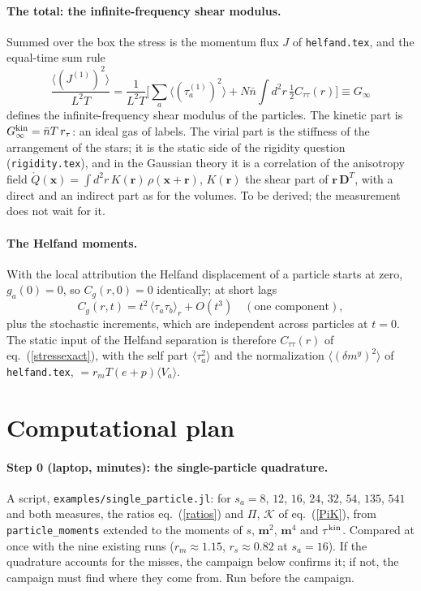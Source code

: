 \documentclass[11pt,aps,preprint,nofootinbib,superscriptaddress,tightenlines]{revtex4-2}
\newcommand{\avg}[1]{\langle #1\rangle}
\def\st{\begin{equation}}
\def\stp{\end{equation}}
\def\Eq#1{eq.~(\ref{#1})}
\let\oldparagraph\paragraph
\renewcommand{\paragraph}{\par\bigskip\oldparagraph}
\begin{document}
\paragraph{The total: the infinite-frequency shear modulus.}  Summed over the box the stress is the momentum flux $J$ of \texttt{helfand.tex}, and the
equal-time sum rule
\st
\frac{\avg{(J^{(1)})^2}}{L^2T}=\frac1{L^2T}\Big[\sum_a\avg{(\tau_a^{(1)})^2}+N\bar n\int d^2r\,\tfrac12C_{\tau\tau}(r)\Big]\equiv G_\infty
\stp
defines the infinite-frequency shear modulus of the particles.  The kinetic part is $G_\infty^{\rm kin}=\bar nT\,r_\tau$: an ideal gas of labels.  The
virial part is the stiffness of the arrangement of the stars; it is the static side of the rigidity question (\texttt{rigidity.tex}), and in the
Gaussian theory it is a correlation of the anisotropy field $\mathring Q(\bm x)=\int d^2r\,K(\bm r)\,\rho(\bm x+\bm r)$, $K(\bm r)$ the shear part of $\bm r\,\bm D^T$, with a direct
and an indirect part as for the volumes.  To be derived; the measurement does not wait for it.

\paragraph{The Helfand moments.}  With the local attribution the Helfand displacement of a particle starts at zero, $g_a(0)=0$, so $C_g(r,0)=0$
identically; at short lags
\st
C_g(r,t)=t^2\,\avg{\tau_a\tau_b}_r+O(t^3)\quad(\text{one component}),
\stp
plus the stochastic increments, which are independent across particles at $t=0$.  The static input of the Helfand separation is therefore
$C_{\tau\tau}(r)$ of \Eq{stressexact}, with the self part $\avg{\tau_a^2}$ and the normalization $\avg{(\delta m^y)^2}$ of \texttt{helfand.tex}, $=r_mT(e+p)\avg{V_a}$.

\section{Computational plan}
\label{sec:plan}

\paragraph{Step 0 (laptop, minutes): the single-particle quadrature.}  A script, \texttt{examples/}\allowbreak\texttt{single\_particle.jl}: for $s_a=8$, $12$, $16$, $24$, $32$, $54$, $135$, $541$
and both measures, the ratios \Eq{ratios} and $\Pi$, $\mathcal K$ of \Eq{PiK}, from \texttt{particle\_moments} extended to the moments of $s$, $\bm m^2$,
$\bm m^4$ and $\tau^{\rm kin}$.  Compared at once with the nine existing runs ($r_m\approx1.15$, $r_s\approx0.82$ at $s_a=16$).  If the quadrature accounts
for the misses, the campaign below confirms it; if not, the campaign must find where they come from.  Run before the campaign.
\end{document}
